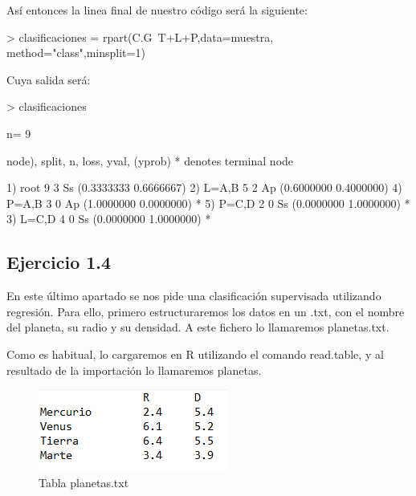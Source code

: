 \documentclass[parskip=full]{scrartcl}
\begin{document}
Así entonces la linea final de nuestro código será la siguiente:


\begin{Schunk}
\begin{Sinput}
> clasificaciones = rpart(C.G~T+L+P,data=muestra, method="class",minsplit=1)
\end{Sinput}
\end{Schunk}


Cuya salida será:


\begin{Schunk}
\begin{Sinput}
> clasificaciones
\end{Sinput}
\begin{Soutput}
n= 9 

node), split, n, loss, yval, (yprob)
      * denotes terminal node

1) root 9 3 Ss (0.3333333 0.6666667)  
  2) L=A,B 5 2 Ap (0.6000000 0.4000000)  
    4) P=A,B 3 0 Ap (1.0000000 0.0000000) *
    5) P=C,D 2 0 Ss (0.0000000 1.0000000) *
  3) L=C,D 4 0 Ss (0.0000000 1.0000000) *
\end{Soutput}
\end{Schunk}


\subsection{Ejercicio 1.4}

En este último apartado se nos pide una clasificación supervisada utilizando regresión.
Para ello, primero estructuraremos los datos en un .txt, con el nombre del planeta, su radio y su densidad. A este fichero lo llamaremos planetas.txt.

Como es habitual, lo cargaremos en R utilizando el comando read.table, y al resultado de la importación lo llamaremos planetas.

\begin{figure}[H]
\centering
\includegraphics[width=0.7\linewidth]{images/imagen6.png}
\caption{\label{fig:tabla_planetas}Tabla planetas.txt}
\end{figure}
\end{document}
